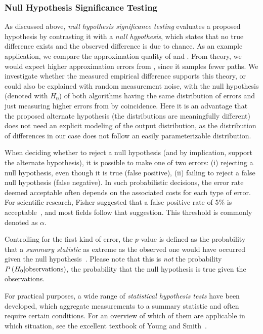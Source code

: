 \documentclass[algorithms,article,submit,moreauthors,pdftex]{Definitions/mdpi}
\newcommand{\changed}[1]{#1}
\begin{document}
\subsubsection{Null Hypothesis Significance Testing}
\label{sec:stats:nhst}
%
As discussed above, \emph{null hypothesis significance testing} evaluates a proposed hypothesis by contrasting it with a \emph{null hypothesis}, which states that no true difference exists and the observed difference is due to chance.
As an example application, we compare the approximation quality of \kad and \rk.
From theory, we would expect higher approximation errors from \kad, since it samples fewer paths.
We investigate whether the measured empirical difference supports this theory, or could also be explained with random measurement noise, \ie with the null hypothesis (denoted with $H_0$) of both algorithms having the same distribution of errors and just measuring higher errors from \kad by coincidence.
%
Here it is an advantage that the proposed alternate hypothesis (\ie the distributions are meaningfully different) does not need an explicit modeling of the output distribution, as the distribution of differences in our case does not follow an easily parameterizable distribution.

When deciding whether to reject a null hypothesis (and by implication, support the alternate hypothesis), it is possible to make one of two errors: (i) rejecting a null hypothesis, even though it is true (false positive),
(ii) failing to reject a false null hypothesis (false negative).
In such probabilistic decisions, the error rate deemed acceptable often depends on the associated costs for each type of error.
For scientific research, Fisher suggested that a false positive rate of 5\% is acceptable~\cite{fisher1992statistical}, and most fields follow that suggestion.
This threshold is commonly denoted as $\alpha$.

Controlling for the first kind of error, the $p$-value is defined as the probability that a \emph{summary statistic} as extreme as the observed one would have occurred given the null hypothesis~\cite{young2005essentials}.
Please note that this is \emph{not} the probability \changed{${P}\left(H_0 | \text{observations}\right)$}, \ie the probability that the null hypothesis is true given the observations.

For practical purposes, a wide range of \emph{statistical hypothesis tests} have been developed, which aggregate measurements to a summary statistic and often require certain conditions.
For an overview of which of them are applicable in which situation, see the excellent textbook of Young and Smith~\cite{young2005essentials}.
\end{document}
